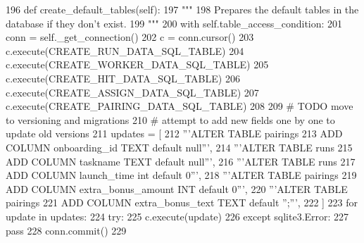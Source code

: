 \begin{DoxyCode}
196     \textcolor{keyword}{def }create\_default\_tables(self):
197         \textcolor{stringliteral}{"""}
198 \textcolor{stringliteral}{        Prepares the default tables in the database if they don't exist.}
199 \textcolor{stringliteral}{        """}
200         with self.table\_access\_condition:
201             conn = self.\_get\_connection()
202             c = conn.cursor()
203             c.execute(CREATE\_RUN\_DATA\_SQL\_TABLE)
204             c.execute(CREATE\_WORKER\_DATA\_SQL\_TABLE)
205             c.execute(CREATE\_HIT\_DATA\_SQL\_TABLE)
206             c.execute(CREATE\_ASSIGN\_DATA\_SQL\_TABLE)
207             c.execute(CREATE\_PAIRING\_DATA\_SQL\_TABLE)
208 
209             \textcolor{comment}{# TODO move to versioning and migrations}
210             \textcolor{comment}{# attempt to add new fields one by one to update old versions}
211             updates = [
212                 \textcolor{stringliteral}{'''ALTER TABLE pairings}
213 \textcolor{stringliteral}{                   ADD COLUMN onboarding\_id TEXT default null'''},
214                 \textcolor{stringliteral}{'''ALTER TABLE runs}
215 \textcolor{stringliteral}{                   ADD COLUMN taskname TEXT default null'''},
216                 \textcolor{stringliteral}{'''ALTER TABLE runs}
217 \textcolor{stringliteral}{                   ADD COLUMN launch\_time int default 0'''},
218                 \textcolor{stringliteral}{'''ALTER TABLE pairings}
219 \textcolor{stringliteral}{                   ADD COLUMN extra\_bonus\_amount INT default 0'''},
220                 \textcolor{stringliteral}{'''ALTER TABLE pairings}
221 \textcolor{stringliteral}{                   ADD COLUMN extra\_bonus\_text TEXT default '';'''},
222             ]
223             \textcolor{keywordflow}{for} update \textcolor{keywordflow}{in} updates:
224                 \textcolor{keywordflow}{try}:
225                     c.execute(update)
226                 \textcolor{keywordflow}{except} sqlite3.Error:
227                     \textcolor{keywordflow}{pass}
228             conn.commit()
229 
\end{DoxyCode}
\mbox{\label{classparlai_1_1mturk_1_1core_1_1mturk__data__handler_1_1MTurkDataHandler_a13d0c1ca0cf41f7f7aca992c995da261}} 
